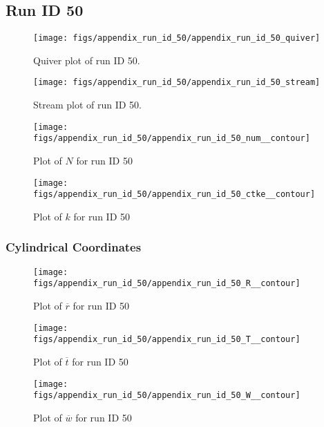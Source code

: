 \subsection{Run ID 50}
\begin{figure}[H]
\centering
\texttt{[image: figs/appendix\_run\_id\_50/appendix\_run\_id\_50\_quiver]}
\caption{Quiver plot of run ID 50.}
\label{fig:appendix_run_id_50_quiver}
\end{figure}


\begin{figure}[H]
\centering
\texttt{[image: figs/appendix\_run\_id\_50/appendix\_run\_id\_50\_stream]}
\caption{Stream plot of run ID 50.}
\label{fig:appendix_run_id_50_stream}
\end{figure}


\begin{figure}[H]
\centering
\texttt{[image: figs/appendix\_run\_id\_50/appendix\_run\_id\_50\_num\_\_contour]}
\caption{Plot of $N$ for run ID 50}
\label{fig:appendix_run_id_50_num__contour}
\end{figure}


\begin{figure}[H]
\centering
\texttt{[image: figs/appendix\_run\_id\_50/appendix\_run\_id\_50\_ctke\_\_contour]}
\caption{Plot of $k$ for run ID 50}
\label{fig:appendix_run_id_50_ctke__contour}
\end{figure}


\subsubsection{Cylindrical Coordinates}
\begin{figure}[H]
\centering
\texttt{[image: figs/appendix\_run\_id\_50/appendix\_run\_id\_50\_R\_\_contour]}
\caption{Plot of $\overline{r}$ for run ID 50}
\label{fig:appendix_run_id_50_R__contour}
\end{figure}


\begin{figure}[H]
\centering
\texttt{[image: figs/appendix\_run\_id\_50/appendix\_run\_id\_50\_T\_\_contour]}
\caption{Plot of $\overline{t}$ for run ID 50}
\label{fig:appendix_run_id_50_T__contour}
\end{figure}


\begin{figure}[H]
\centering
\texttt{[image: figs/appendix\_run\_id\_50/appendix\_run\_id\_50\_W\_\_contour]}
\caption{Plot of $\overline{w}$ for run ID 50}
\label{fig:appendix_run_id_50_W__contour}
\end{figure}


